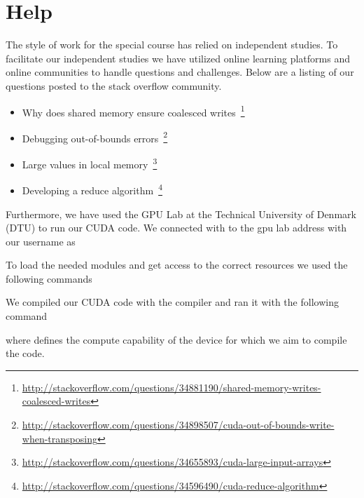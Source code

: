 \section{Help}
\label{sec:help}

The style of work for the special course has relied on independent studies.
To facilitate our independent studies we have utilized online learning platforms and online communities to handle questions and challenges.
Below are a listing of our questions posted to the stack overflow community.

\begin{itemize}
  \item Why does shared memory ensure coalesced writes~\footnote{\href{http://stackoverflow.com/questions/34881190/shared-memory-writes-coalesced-writes}{http://stackoverflow.com/questions/34881190/shared-memory-writes-coalesced-writes}}
  \item Debugging out-of-bounds errors~\footnote{\href{http://stackoverflow.com/questions/34898507/cuda-out-of-bounds-write-when-transposing}{http://stackoverflow.com/questions/34898507/cuda-out-of-bounds-write-when-transposing}}
  \item Large values in local memory~\footnote{\href{http://stackoverflow.com/questions/34655893/cuda-large-input-arrays}{http://stackoverflow.com/questions/34655893/cuda-large-input-arrays}}
  \item Developing a reduce algorithm~\footnote{\href{http://stackoverflow.com/questions/34596490/cuda-reduce-algorithm}{http://stackoverflow.com/questions/34596490/cuda-reduce-algorithm}}
\end{itemize}

Furthermore, we have used the GPU Lab at the Technical University of Denmark (DTU) to run our CUDA code.
We connected with  to the gpu lab address with our username as 
%
\begin{quote}
\end{quote}
%
To load the needed modules and get access to the correct resources we used the following commands
%
\begin{quote}
\end{quote}
%
We compiled our CUDA code with the  compiler and ran it with the following command
%
\begin{quote}
\end{quote}
%
where  defines the compute capability of the device for which we aim to compile the code.
